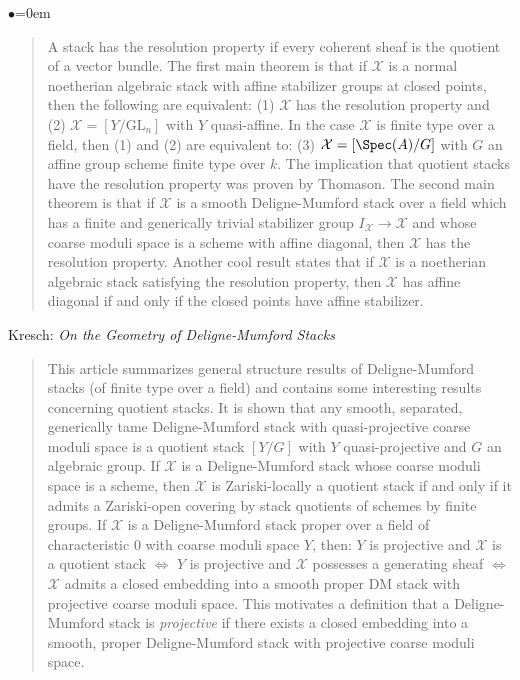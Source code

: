 \begin{list}{$\bullet$}{\leftmargin=0em}
\begin{quote}
A stack has the resolution property if every coherent sheaf is the quotient of
a vector bundle. The first main theorem is that if $\mathcal{X}$ is a normal
noetherian algebraic stack with affine stabilizer groups at closed points, then
the following are equivalent: (1) $\mathcal{X}$ has the resolution property and
(2)
$\mathcal{X} = [Y/\text{GL}_n]$ with $Y$ quasi-affine. In the case
$\mathcal{X}$ is finite type over
a field, then (1) and (2) are equivalent to: (3)
$\mathcal{X} = [\Spec(A)/G]$ with $G$
an affine group scheme finite type over $k$. The implication that quotient
stacks have the resolution property was proven by Thomason.
The second main theorem is that if $\mathcal{X}$ is a smooth Deligne-Mumford
stack over
a field which has a finite and generically trivial stabilizer group
$I_\mathcal{X}
\to \mathcal{X}$ and whose coarse moduli space is a scheme with affine
diagonal, then
$\mathcal{X}$ has the resolution property. Another cool result states that if
$\mathcal{X}$ is
a noetherian algebraic stack satisfying the resolution property, then
$\mathcal{X}$ has
affine diagonal if and only if the closed points have affine stabilizer.
\end{quote}
\smallskip
\item Kresch: \emph{On the Geometry of Deligne-Mumford Stacks}
\cite{kresch_geometry}
\begin{quote}
This article summarizes general structure results of Deligne-Mumford
stacks (of finite type over a field) and contains some interesting results
concerning quotient stacks. It is shown that any smooth, separated,
generically tame Deligne-Mumford stack with quasi-projective coarse moduli
space is a quotient stack $[Y/G]$ with $Y$ quasi-projective and $G$ an
algebraic group. If $\mathcal{X}$ is a Deligne-Mumford stack whose coarse
moduli space
is a scheme, then $\mathcal{X}$ is Zariski-locally a quotient stack if and only
if it
admits a Zariski-open covering by stack quotients of schemes by finite groups.
If $\mathcal{X}$ is a Deligne-Mumford stack proper over a field of
characteristic 0
with coarse moduli space $Y$, then: $Y$ is projective and $\mathcal{X}$ is a
quotient
stack $\iff$ $Y$ is projective and $\mathcal{X}$ possesses a generating sheaf
$\iff$
$\mathcal{X}$ admits a closed embedding into a smooth proper DM stack with
projective
coarse moduli space. This motivates a definition that a Deligne-Mumford stack
is \emph{projective} if there exists a closed embedding into a smooth, proper
Deligne-Mumford stack with projective coarse moduli space.
\end{quote}

\end{list}
